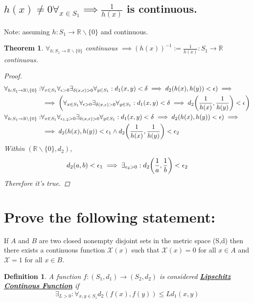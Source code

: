 \documentclass[]{article}
\newcommand{\R}{\mathbb{R}}
\newtheorem{definition}{Definition}
\newtheorem{theorem}{Theorem}
\begin{document}
\subsection{$h(x) \neq 0 \forall_{x\in S_1} \implies \frac{1}{h(x)}$ is continuous.}
Note: assuming $h : S_1 \to \R \backslash \{0\}$ and continuous.
\begin{theorem}
    $\forall_{h : S_1 \to \R \backslash \{0\}}$ continuous $\implies (h(x))^{-1} := \frac{1}{h(x)}: S_1 \to \R$ continuous.
    \begin{proof}
        \begin{align*}
            \forall_{h : S_1 \to \R \backslash \{0\}} : 
                &\forall_{x\in S_1} \forall_{\epsilon>0} \exists_{\delta(x,\epsilon)>0} \forall_{y\in S_1} : d_1(x,y) < \delta \implies d_2(h(x),h(y)) < \epsilon) \implies\\
                &\implies \qty(\forall_{x\in S_1} \forall_{\epsilon>0} \exists_{\delta(x,\epsilon)>0} \forall_{y\in S_1} : d_1(x,y) < \delta \implies d_2\qty(\frac{1}{h(x)},\frac{1}{h(y)}) < \epsilon)\\
            \forall_{h : S_1 \to \R \backslash \{0\}} :
                &\forall_{x\in S_1} \forall_{\epsilon_{1,2}>0} \exists_{\delta(x,\epsilon)>0} \forall_{y\in S_1} : d_1(x,y) < \delta \implies d_2(h(x),h(y)) < \epsilon) \implies\\
                &\implies d_2(h(x),h(y)) < \epsilon_1 \land d_2\qty(\frac{1}{h(x)},\frac{1}{h(y)})< \epsilon_2
        \end{align*}
        Within $(\R \backslash \{0\}, d_2)$, 
        $$d_2(a,b) < \epsilon_1 \implies \exists_{\epsilon_2>0} : d_2 \qty(\frac{1}{a}, \frac{1}{b}) < \epsilon_2$$
        Therefore it's true.
    \end{proof}
\end{theorem}


\newpage
\section{Prove the following statement:}
If $A$ and $B$ are two closed nonempty disjoint %
sets in the metric space (S,d) then there exists a continuous function $\mathcal{X}(x)$ such that $\mathcal{X}(x) = 0$ for all $x \in A$ and $\mathcal{X} = 1$ for all $x \in B$.
\begin{definition}
    A function $f : (S_1, d_1) \to (S_2, d_2)$ is considered \textbf{\underline{Lipschitz Continous Function}} if 
    $$\exists_{L>0} : \forall_{x,y \in S_1} d_2 (f(x),f(y)) \leq L d_1(x,y)$$
\end{definition}
\end{document}
